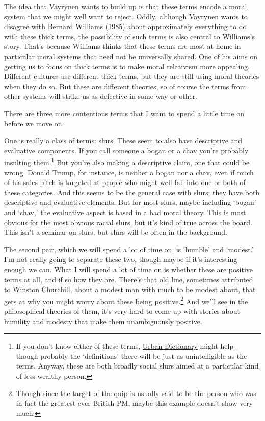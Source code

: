 \documentclass[
]{article}
\begin{document}
The idea that Vayrynen wants to build up is that these terms encode a
moral system that we might well want to reject. Oddly, although Vayrynen
wants to disagree with Bernard Williams (1985) about approximately
everything to do with these thick terms, the possibility of such terms
is also central to Williams's story. That's because Williams thinks that
these terms are most at home in particular moral systems that need not
be universally shared. One of his aims on getting us to focus on thick
terms is to make moral relativism more appealing. Different cultures use
different thick terms, but they are still using moral theories when they
do so. But these are different theories, so of course the terms from
other systems will strike us as defective in some way or other.

There are three more contentious terms that I want to spend a little
time on before we move on.

One is really a class of terms: slurs. These seem to also have
descriptive and evaluative components. If you call someone a bogan or a
chav you're probably insulting them.\footnote{If you don't know either
  of these terms,
  \href{https://www.urbandictionary.com/define.php?term=bogan}{Urban
  Dictionary} might help - though probably the `definitions' there will
  be just as unintelligible as the terms. Anyway, these are both broadly
  social slurs aimed at a particular kind of less wealthy person.} But
you're also making a descriptive claim, one that could be wrong. Donald
Trump, for instance, is neither a bogan nor a chav, even if much of his
sales pitch is targeted at people who might well fall into one or both
of these categories. And this seems to be the general case with slurs;
they have both descriptive and evaluative elements. But for most slurs,
maybe including `bogan' and `chav,' the evaluative aspect is based in a
bad moral theory. This is most obvious for the most obvious racial
slurs, but it's kind of true across the board. This isn't a seminar on
slurs, but slurs will be often in the background.

The second pair, which we will spend a lot of time on, is `humble' and
`modest.' I'm not really going to separate these two, though maybe if
it's interesting enough we can. What I will spend a lot of time on is
whether these are positive terms at all, and if so how they are. There's
that old line, sometimes attributed to Winston Churchill, about a modest
man with much to be modest about, that gets at why you might worry about
these being positive.\footnote{Though since the target of the quip is
  usually said to be the person who was in fact the greatest ever
  British PM, maybe this example doesn't show very much.} And we'll see
in the philosophical theories of them, it's very hard to come up with
stories about humility and modesty that make them unambiguously
positive.
\end{document}
